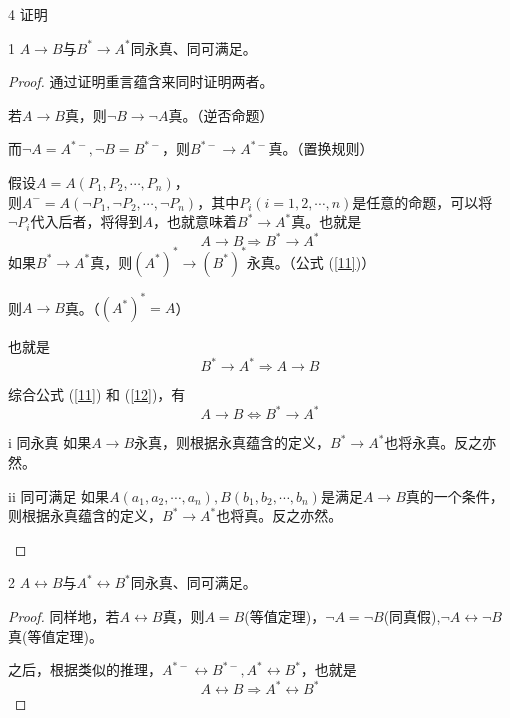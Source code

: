 \documentclass[12pt]{article}
\newenvironment{firstlayer}%
{\begin{list}{}{\renewcommand{\makelabel}[1]{\textbf{##1}.\hfil}
}}
{\end{list}}
\newenvironment{secondlayer}%
{\begin{list}{}{\renewcommand{\makelabel}[1]{(##1)\hfil}
}}
{\end{list}}
\begin{document}
\begin{CJK}{UTF8}{gbsn}
\begin{firstlayer}
\item[4]证明
\begin{secondlayer}
  \item[1]\(A\rightarrow B\)与\(B^*\rightarrow A^*\)同永真、同可满足。
  \begin{proof}
    通过证明重言蕴含来同时证明两者。

若\(A\rightarrow B\)真，则\(\neg B\rightarrow \neg A\)真。（逆否命题）

而\(\neg A=A^{*-},\neg B=B^{*-}\)，则\(B^{*-}\rightarrow A^{*-}\)真。（置换规则）

假设\(A=A(P_1,P_2,\cdots,P_n)\)，\\
则\(A^-=A(\neg P_1,\neg P_2,\cdots,\neg P_n)\)，其中\(P_i(i=1,2,\cdots,n)\)是任意的命题，可以将\(\neg P_i\)代入后者，将得到\(A\)，也就意味着\(B^*\rightarrow A^*\)真。也就是
\begin{equation}\label{11}
  A\rightarrow B\Rightarrow B^*\rightarrow A^*
\end{equation}
如果\(B^*\rightarrow A^*\)真，则\((A^*)^*\rightarrow (B^*)^*\)永真。（公式 (\ref{11})）

则\(A\rightarrow B\)真。（\((A^*)^*=A\)）

也就是
\begin{equation}\label{12}
  B^*\rightarrow A^* \Rightarrow A\rightarrow B
\end{equation}

综合公式 (\ref{11}) 和 (\ref{12})，有
\begin{equation}
  A\rightarrow B\Leftrightarrow B^*\rightarrow A^*
\end{equation}
\begin{secondlayer}
  \item[i 同永真]如果\(A→B\)永真，则根据永真蕴含的定义，\(B^*→A^*\)也将永真。反之亦然。
  \item[ii 同可满足]如果\(A(a_1,a_2,\cdots,a_n),B(b_1,b_2,\cdots,b_n)\)是满足\(A\rightarrow B\)真的一个条件，则根据永真蕴含的定义，\(B^*\rightarrow A^*\)也将真。反之亦然。
\end{secondlayer}

  \end{proof}
  
\item[2]\(A\leftrightarrow B\)与\(A^*\leftrightarrow B^*\)同永真、同可满足。
\begin{proof}
  同样地，若\(A\leftrightarrow B\)真，则\(A=B\)(等值定理)，\(\neg A=\neg B\)(同真假),\(\neg A\leftrightarrow \neg B\)真(等值定理)。

之后，根据类似的推理，\(A^{*-}\leftrightarrow B^{*-},A^{*}\leftrightarrow B^{*}\)，也就是
\begin{equation}\label{21}
  A\leftrightarrow B \Rightarrow A^*\leftrightarrow B^*
\end{equation}


\end{proof}
\end{secondlayer}
\end{firstlayer}
\end{CJK}
\end{document}
